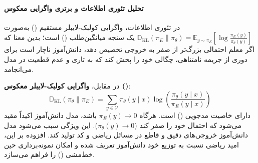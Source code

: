 \paragraph*{تحلیل تئوری اطلاعات و برتری واگرایی  معکوس}
در تئوری اطلاعات، واگرایی کولبک-لایبلر مستقیم () به‌صورت $\mathbb{D}_{\text{KL}}(\pi_E \parallel \pi_\theta) = \mathbb{E}_{y \sim \pi_E}\left[\log \frac{\pi_E(y)}{\pi_\theta(y)}\right]$ یک سنجه میانگین‌طلب () است؛ بدین معنا که اگر معلم احتمالی بزرگ‌تر از صفر به خروجی تخصیص دهد، دانش‌آموز ناچار است برای دوری از جریمه نامتناهی، چگالی خود را پخش کند که به تاری و عدم قطعیت در مدل می‌انجامد. 

در مقابل، \textbf{واگرایی کولبک-لایبلر معکوس ()}:
\begin{equation}
    \mathbb{D}_{\text{KL}}(\pi_\theta \parallel \pi_E) = \sum_{y \in \mathcal{V}} \pi_\theta(y \mid x) \log \left( \frac{\pi_\theta(y \mid x)}{\pi_E(y \mid x)} \right)
\end{equation}
دارای خاصیت مدجویی () است. هرگاه $\pi_E(y) \to 0$ باشد، مدل دانش‌آموز اکیداً مقید می‌شود که احتمال خود را صفر کند ($\pi_\theta(y) \to 0$). این ویژگی سبب می‌شود مدل دانش‌آموز خروجی‌های دقیق و قاطع در مسائل ریاضی و کد تولید کند. افزوده بر این، امید ریاضی نسبت به توزیع خود دانش‌آموز تعریف شده و امکان نمونه‌برداری حین خط‌مشی () را فراهم می‌سازد.

